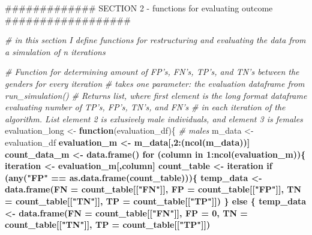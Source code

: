 \documentclass[]{article}
\newenvironment{Shaded}{\begin{snugshade}}{\end{snugshade}}
\newcommand{\KeywordTok}[1]{\textcolor[rgb]{0.13,0.29,0.53}{\textbf{#1}}}
\newcommand{\DataTypeTok}[1]{\textcolor[rgb]{0.13,0.29,0.53}{#1}}
\newcommand{\DecValTok}[1]{\textcolor[rgb]{0.00,0.00,0.81}{#1}}
\newcommand{\StringTok}[1]{\textcolor[rgb]{0.31,0.60,0.02}{#1}}
\newcommand{\CommentTok}[1]{\textcolor[rgb]{0.56,0.35,0.01}{\textit{#1}}}
\newcommand{\ControlFlowTok}[1]{\textcolor[rgb]{0.13,0.29,0.53}{\textbf{#1}}}
\newcommand{\OperatorTok}[1]{\textcolor[rgb]{0.81,0.36,0.00}{\textbf{#1}}}
\newcommand{\NormalTok}[1]{#1}
\begin{document}
\begin{Shaded}
\begin{Highlighting}[]
{{\NormalTok{############# SECTION 2 - functions for evaluating outcome ##################}

\CommentTok{# in this section I define functions for restructuring and evaluating the data from a simulation of n iterations}

\CommentTok{# Function for determining amount of FP's, FN's, TP's, and TN's between the genders for every iteration}
\CommentTok{# takes one parameter: the evaluation dataframe from run_simulation()}
\CommentTok{# Returns list, where first element is the long format dataframe evaluating number of TP's, FP's, TN's, and FN's}
\CommentTok{# in each iteration of the algorithm. List element 2 is exlusively male individuals, and element 3 is females}
\NormalTok{evaluation_long <-}\StringTok{ }\ControlFlowTok{function}\NormalTok{(evaluation_df)\{}
  \CommentTok{# males}
\NormalTok{  m_data <-}\StringTok{ }\NormalTok{evaluation_df }\OperatorTok{%>%}\StringTok{ }\KeywordTok{filter}\NormalTok{(gender }\OperatorTok{==}\StringTok{ "M"}\NormalTok{)}
\NormalTok{  evaluation_m <-}\StringTok{ }\NormalTok{m_data[,}\DecValTok{2}\OperatorTok{:}\NormalTok{(}\KeywordTok{ncol}\NormalTok{(m_data))]}
\NormalTok{  count_data_m <-}\StringTok{ }\KeywordTok{data.frame}\NormalTok{()}
  \ControlFlowTok{for}\NormalTok{ (column }\ControlFlowTok{in} \DecValTok{1}\OperatorTok{:}\KeywordTok{ncol}\NormalTok{(evaluation_m))\{}
\NormalTok{    iteration <-}\StringTok{ }\NormalTok{evaluation_m[,column]}
\NormalTok{    count_table <-}\StringTok{ }\NormalTok{iteration }\OperatorTok{%>%}\StringTok{ }\KeywordTok{unlist}\NormalTok{() }\OperatorTok{%>%}\StringTok{ }\KeywordTok{table}\NormalTok{()}
    \ControlFlowTok{if}\NormalTok{ (}\KeywordTok{any}\NormalTok{(}\StringTok{"FP"} \OperatorTok{==}\StringTok{ }\KeywordTok{as.data.frame}\NormalTok{(count_table)))\{}
\NormalTok{      temp_data <-}\StringTok{ }\KeywordTok{data.frame}\NormalTok{(}\DataTypeTok{FN =}\NormalTok{ count_table[[}\StringTok{"FN"}\NormalTok{]], }\DataTypeTok{FP =}\NormalTok{ count_table[[}\StringTok{"FP"}\NormalTok{]], }\DataTypeTok{TN =}\NormalTok{ count_table[[}\StringTok{"TN"}\NormalTok{]], }\DataTypeTok{TP =}\NormalTok{ count_table[[}\StringTok{"TP"}\NormalTok{]])}
\NormalTok{    \}}
    \ControlFlowTok{else}\NormalTok{ \{}
\NormalTok{    temp_data <-}\StringTok{ }\KeywordTok{data.frame}\NormalTok{(}\DataTypeTok{FN =}\NormalTok{ count_table[[}\StringTok{"FN"}\NormalTok{]], }\DataTypeTok{FP =} \DecValTok{0}\NormalTok{, }\DataTypeTok{TN =}\NormalTok{ count_table[[}\StringTok{"TN"}\NormalTok{]], }\DataTypeTok{TP =}\NormalTok{ count_table[[}\StringTok{"TP"}\NormalTok{]])}
}}}}
\end{Highlighting}
\end{Shaded}
\end{document}
